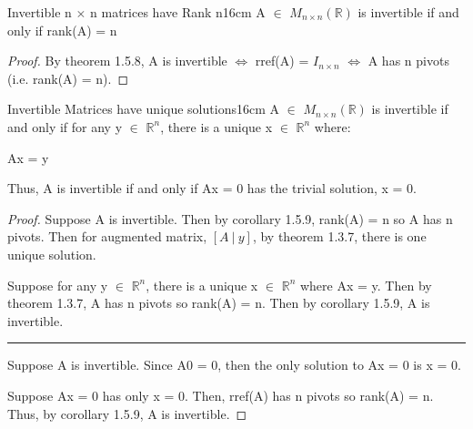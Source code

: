     \begin{corollary}{Invertible n $\times$ n matrices have Rank n}{16cm}
        A $\in$ $M_{n \times n}(\mathbb{R})$ is invertible if and only if
        rank(A) = n
    \end{corollary}

    \begin{proof}
        By {\color{red} theorem 1.5.8}, A
        is invertible $\Leftrightarrow$ rref(A) = $I_{n \times n}$
        $\Leftrightarrow$ A has n pivots (i.e. rank(A) = n).
    \end{proof}

    \vspace{0.5cm}



    \begin{corollary}{Invertible Matrices have unique solutions}{16cm}
        A $\in$ $M_{n \times n}(\mathbb{R})$ is invertible if and only if
        for any y $\in$ $\mathbb{R}^n$, there is a unique
        x $\in$ $\mathbb{R}^n$ where:
        
        \hspace{0.5cm}
        Ax = y

        Thus, A is invertible if and only if Ax = 0 has the trivial
        solution, x = 0.
    \end{corollary}

    \begin{proof}
        Suppose A is invertible.
        Then by {\color{orange} corollary 1.5.9},
        rank(A) = n so A has n pivots. Then for augmented matrix, $[A \ | \ y]$,
        by {\color{red} theorem 1.3.7}, there is one unique solution.

        \vspace{0.2cm}

        Suppose for any y $\in$ $\mathbb{R}^n$, there is a unique
        x $\in$ $\mathbb{R}^n$ where Ax = y.
        Then by {\color{red} theorem 1.3.7}, A has n pivots so rank(A) = n.
        Then by {\color{orange} corollary 1.5.9}, A is invertible.

        \rule[0.1cm]{16.7cm}{0.01cm}

        Suppose A is invertible.
        Since A0 = 0, then the only solution to Ax = 0 is x = 0.

        \vspace{0.2cm}

        Suppose Ax = 0 has only x = 0.
        Then, rref(A) has n pivots so rank(A) = n.
        Thus, by {\color{orange} corollary 1.5.9}, A is invertible.
    \end{proof}


